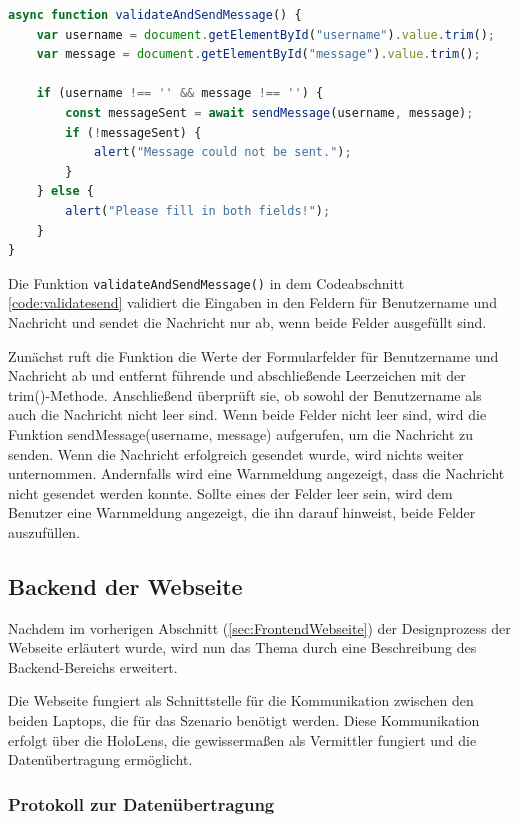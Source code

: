 \begin{lstlisting}[language=JavaScript, caption={Javascript | Validierung und Senden der Message}, label=code:validatesend]
async function validateAndSendMessage() {
    var username = document.getElementById("username").value.trim();
    var message = document.getElementById("message").value.trim();

    if (username !== '' && message !== '') {
        const messageSent = await sendMessage(username, message);
        if (!messageSent) {
            alert("Message could not be sent.");
        }
    } else {
        alert("Please fill in both fields!");
    }
}
\end{lstlisting}
Die Funktion \texttt{validateAndSendMessage()} in dem Codeabschnitt \ref{code:validatesend} validiert die Eingaben in den Feldern für Benutzername und Nachricht und sendet die Nachricht nur ab, wenn beide Felder ausgefüllt sind.

Zunächst ruft die Funktion die Werte der Formularfelder für Benutzername und Nachricht ab und entfernt führende und abschließende Leerzeichen mit der trim()-Methode. Anschließend überprüft sie, ob sowohl der Benutzername als auch die Nachricht nicht leer sind. Wenn beide Felder nicht leer sind, wird die Funktion sendMessage(username, message) aufgerufen, um die Nachricht zu senden. Wenn die Nachricht erfolgreich gesendet wurde, wird nichts weiter unternommen. Andernfalls wird eine Warnmeldung angezeigt, dass die Nachricht nicht gesendet werden konnte. Sollte eines der Felder leer sein, wird dem Benutzer eine Warnmeldung angezeigt, die ihn darauf hinweist, beide Felder auszufüllen.


\subsection{\label{sec:webBackend}Backend der Webseite}

Nachdem im vorherigen Abschnitt (\ref{sec:FrontendWebseite}) der Designprozess der Webseite erläutert wurde, wird nun das Thema durch eine Beschreibung des Backend-Bereichs erweitert.

Die Webseite fungiert als Schnittstelle für die Kommunikation zwischen den beiden Laptops, die für das Szenario benötigt werden. Diese Kommunikation erfolgt über die HoloLens, die gewissermaßen als Vermittler fungiert und die Datenübertragung ermöglicht.

\subsubsection{Protokoll zur Datenübertragung}

